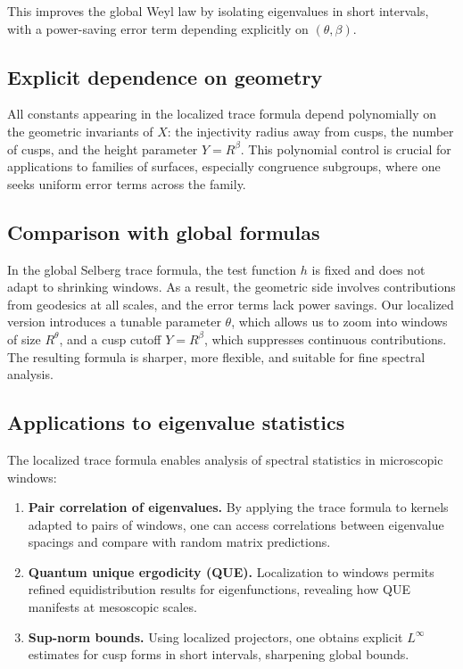 This improves the global Weyl law by isolating eigenvalues in short intervals, with a power-saving error term depending explicitly on $(\theta,\beta)$.

\subsection{Explicit dependence on geometry}\label{subsec:geometry-dependence}

All constants appearing in the localized trace formula depend polynomially on the geometric invariants of $X$: the injectivity radius away from cusps, the number of cusps, and the height parameter $Y=R^\beta$. This polynomial control is crucial for applications to families of surfaces, especially congruence subgroups, where one seeks uniform error terms across the family.

\subsection{Comparison with global formulas}\label{subsec:comparison-global}

In the global Selberg trace formula, the test function $h$ is fixed and does not adapt to shrinking windows. As a result, the geometric side involves contributions from geodesics at all scales, and the error terms lack power savings. Our localized version introduces a tunable parameter $\theta$, which allows us to zoom into windows of size $R^\theta$, and a cusp cutoff $Y=R^\beta$, which suppresses continuous contributions. The resulting formula is sharper, more flexible, and suitable for fine spectral analysis.

\subsection{Applications to eigenvalue statistics}\label{subsec:eigenvalue-stats}

The localized trace formula enables analysis of spectral statistics in microscopic windows:

\begin{enumerate}
\item \textbf{Pair correlation of eigenvalues.} By applying the trace formula to kernels adapted to pairs of windows, one can access correlations between eigenvalue spacings and compare with random matrix predictions.
\item \textbf{Quantum unique ergodicity (QUE).} Localization to windows permits refined equidistribution results for eigenfunctions, revealing how QUE manifests at mesoscopic scales.
\item \textbf{Sup-norm bounds.} Using localized projectors, one obtains explicit $L^\infty$ estimates for cusp forms in short intervals, sharpening global bounds.
\end{enumerate}


